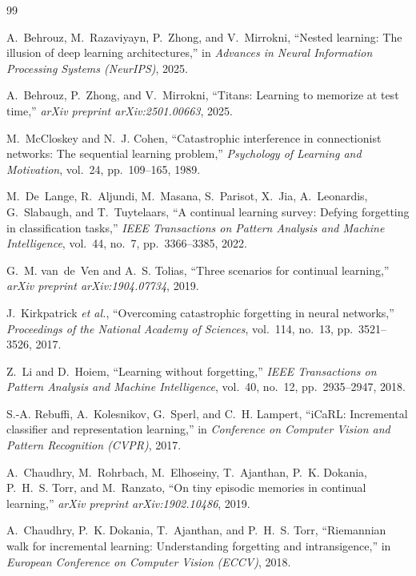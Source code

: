 \documentclass[12pt,a4paper]{report}
\begin{document}
\begin{thebibliography}{99}

A.~Behrouz, M.~Razaviyayn, P.~Zhong, and V.~Mirrokni, ``Nested learning: The illusion of deep learning architectures,'' in \emph{Advances in Neural Information Processing Systems (NeurIPS)}, 2025.

A.~Behrouz, P.~Zhong, and V.~Mirrokni, ``Titans: Learning to memorize at test time,'' \emph{arXiv preprint arXiv:2501.00663}, 2025.

M.~McCloskey and N.~J. Cohen, ``Catastrophic interference in connectionist networks: The sequential learning problem,'' \emph{Psychology of Learning and Motivation}, vol.~24, pp.~109--165, 1989.

M.~De~Lange, R.~Aljundi, M.~Masana, S.~Parisot, X.~Jia, A.~Leonardis, G.~Slabaugh, and T.~Tuytelaars, ``A continual learning survey: Defying forgetting in classification tasks,'' \emph{IEEE Transactions on Pattern Analysis and Machine Intelligence}, vol.~44, no.~7, pp.~3366--3385, 2022.

G.~M. van~de~Ven and A.~S. Tolias, ``Three scenarios for continual learning,'' \emph{arXiv preprint arXiv:1904.07734}, 2019.

J.~Kirkpatrick \emph{et al.}, ``Overcoming catastrophic forgetting in neural networks,'' \emph{Proceedings of the National Academy of Sciences}, vol.~114, no.~13, pp.~3521--3526, 2017.

Z.~Li and D.~Hoiem, ``Learning without forgetting,'' \emph{IEEE Transactions on Pattern Analysis and Machine Intelligence}, vol.~40, no.~12, pp.~2935--2947, 2018.

S.-A. Rebuffi, A.~Kolesnikov, G.~Sperl, and C.~H. Lampert, ``iCaRL: Incremental classifier and representation learning,'' in \emph{Conference on Computer Vision and Pattern Recognition (CVPR)}, 2017.

A.~Chaudhry, M.~Rohrbach, M.~Elhoseiny, T.~Ajanthan, P.~K. Dokania, P.~H.~S. Torr, and M.~Ranzato, ``On tiny episodic memories in continual learning,'' \emph{arXiv preprint arXiv:1902.10486}, 2019.

A.~Chaudhry, P.~K. Dokania, T.~Ajanthan, and P.~H.~S. Torr, ``Riemannian walk for incremental learning: Understanding forgetting and intransigence,'' in \emph{European Conference on Computer Vision (ECCV)}, 2018.


\end{thebibliography}
\end{document}
